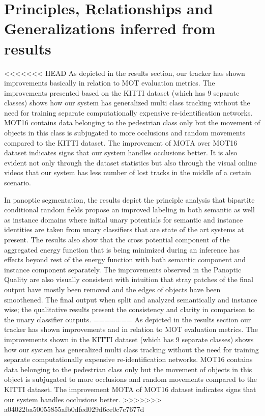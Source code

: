 \section{Principles, Relationships and Generalizations inferred from results}
<<<<<<< HEAD
As depicted in the results section, our tracker has shown improvements basically in relation to MOT evaluation metrics. The improvements presented based on the KITTI dataset (which has 9 separate classes) shows how our system has generalized multi class tracking without the need for training separate computationally expensive re-identification networks. MOT16 contains data belonging to the pedestrian class only but the movement of objects in this class is subjugated to more occlusions and random movements compared to the KITTI dataset. The improvement of MOTA over MOT16 dataset indicates signs that our system handles occlusions better. It is also evident not only through the dataset statistics but also through the visual online videos that our system has less number of lost tracks in the middle of a certain scenario.

In panoptic segmentation, the results depict the principle analysis that bipartite conditional random fields propose an improved labeling in both semantic as well as instance domains where initial unary potentials for semantic and instance identities are taken from unary classifiers that are state of the art systems at present. The results also show that the cross potential component of the aggregated energy function that is being minimized during an inference has effects beyond rest of the energy function with both semantic component and instance component separately. The improvements observed in the Panoptic Quality are also visually consistent with intuition that stray patches of the final output have mostly been removed and the edges of objects have been smoothened. The final output when split and analyzed semantically and instance wise; the qualitative results present the consistency and clarity in comparison to the unary classifier outputs.
=======
As depicted in the results section our tracker has shown improvements and in relation to MOT evaluation metrics. The improvements shown in the KITTI dataset (which has 9 separate classes) shows how our system has generalized multi class tracking without the need for training separate computationally expensive re-identification networks. MOT16 contains data belonging to the pedestrian class only but the movement of objects in this object is subjugated to more occlusions and random movements compared to the KITTI dataset. The improvement MOTA of MOT16 dataset indicates signs that our system handles occlusions better. 
>>>>>>> a04022ba50055855afb0dfed029d6ce0c7c7677d

